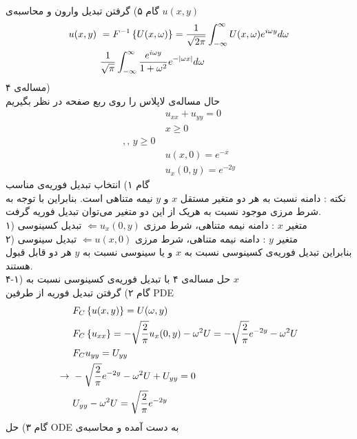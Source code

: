 گام ۵) گرفتن تبدیل وارون و محاسبه‌ی 
$u(x,y)$
\begin{equation*}
	\begin{aligned}
		u(x,y) &\ =
		F^{-1}\left\{U(x,\omega)\right\}=\frac{1}{\sqrt{2\pi}}\int_{-\infty}^\infty U(x,\omega)e^{i\omega y}d\omega
		\\ &\
		\frac1{\sqrt{\pi}}\int_{-\infty}^\infty \frac{e^{i\omega y}}{1+\omega^2}e^{-\left|\omega x\right|}d\omega
	\end{aligned}
\end{equation*}
مساله‌ی ۴)\\
حال مساله‌ی لاپلاس را روی ربع صفحه در نظر بگیریم
\begin{equation*}
	\begin{aligned}
		&\
		u_{xx}+u_{yy}=0
		\\ &\
		x\ge0\\, , \, y\ge0
		\\ &\
		u(x,0)=e^{-x}
		\\ &\
		u_x(0,y)=e^{-2y}
	\end{aligned}
\end{equation*}
گام ۱) انتخاب تبدیل فوریه‌ی مناسب\\
نکته : دامنه نسبت به هر دو متغیر مستقل
$x$
و
$y$
نیمه متناهی است. بنابراین با توجه به شرط مرزی موجود نسبت به هر‌یک از این دو متغیر می‌توان تبدیل فوریه گرفت.\\
۱) متغیر
$x$
: دامنه نیمه متناهی، شرط مرزی \quad
$\Leftarrow u_x(0,y)$
تبدیل کسینوسی\\
۲) متغیر
$y$
: دامنه نیمه متناهی، شرط مرزی \quad
$\Leftarrow u(x,0)$
تبدیل سینوسی\\
بنابراین تبدیل فوریه‌ی کسینوسی نسبت به
$x$
و یا سینوسی نسبت به
$y$
هر دو قابل قبول هستند.\\
۴-۱) حل مساله‌ی ۴ با تبدیل فوریه‌ی کسینوسی نسبت به
$x$\\
گام ۲) گرفتن تبدیل فوریه از طرفین PDE
\begin{equation*}
	\begin{aligned}
		&\
		F_C\left\{u(x,y)\right\}=U(\omega,y)
		\\ &\
		F_C\left\{u_{xx}\right\}=-\sqrt\frac2\pi u_x(0,y)-\omega^2U=-\sqrt\frac2\pi e^{-2y}-\omega^2U
		\\ &\
		F_C{u_{yy}}=U_{yy}
		\\ \rightarrow &\
		-\sqrt\frac2\pi e^{-2y}-\omega^2U+U_{yy}=0
		\\ &\
		U_{yy}-\omega^2U=\sqrt\frac2\pi e^{-2y}
	\end{aligned}
\end{equation*}
گام ۳) حل ODE به دست آمده و محاسبه‌ی
